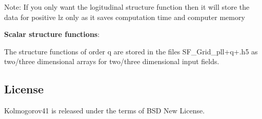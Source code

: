 Note\-: If you only want the logitudinal structure function then it will store the data for positive {\ttfamily lz} only as it saves computation time and computer memory

{\bfseries Scalar structure functions}\-:

The structure functions of order {\ttfamily q} are stored in the files {\ttfamily S\-F\-\_\-\-Grid\-\_\-pll}+{\ttfamily q}+{\ttfamily .h5} as two/three dimensional arrays for two/three dimensional input fields.

\subsection*{License}

Kolmogorov41 is released under the terms of B\-S\-D New License. 